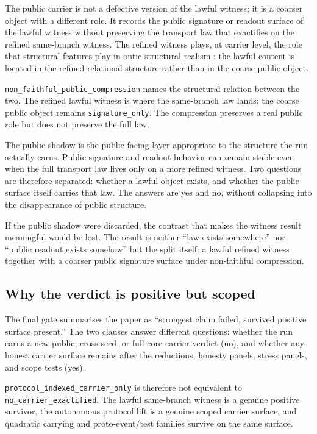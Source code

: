 \documentclass[11pt]{article}
\theoremstyle{definition}
\begin{document}
The public carrier is not a defective version of the lawful witness; it is a coarser
object with a different role. It records the public signature or readout surface of
the lawful witness without preserving the transport law that exactifies on the
refined same-branch witness. The refined witness plays, at carrier level, the role
that structural features play in ontic structural realism
\citep{FrenchLadyman2003}: the lawful content is located in the refined relational
structure rather than in the coarse public object.

\texttt{non\_faithful\_public\_compression} names the structural relation between the
two. The refined lawful witness is where the same-branch law lands; the coarse
public object remains \texttt{signature\_only}. The compression preserves a real
public role but does not preserve the full law.

The public shadow is the public-facing layer appropriate to the structure the run
actually earns. Public signature and readout behavior can remain stable even when the
full transport law lives only on a more refined witness. Two questions are therefore
separated: whether a lawful object exists, and whether the public surface itself
carries that law. The answers are yes and no, without collapsing into the
disappearance of public structure.

If the public shadow were discarded, the contrast that makes the witness result
meaningful would be lost. The result is neither ``law exists somewhere'' nor
``public readout exists somehow'' but the split itself: a lawful refined witness
together with a coarser public signature surface under non-faithful compression.

\subsection{Why the verdict is positive but scoped}

The final gate summarises the paper as ``strongest claim failed, survived positive
surface present.'' The two clauses answer different questions: whether the run earns
a new public, cross-seed, or full-core carrier verdict (no), and whether any honest
carrier surface remains after the reductions, honesty panels, stress panels, and
scope tests (yes).

\texttt{protocol\_indexed\_carrier\_only} is therefore not equivalent to
\texttt{no\_carrier\_exactified}. The lawful same-branch witness is a genuine
positive survivor, the autonomous protocol lift is a genuine scoped carrier surface,
and quadratic carrying and proto-event/test families survive on the same surface.
\end{document}
